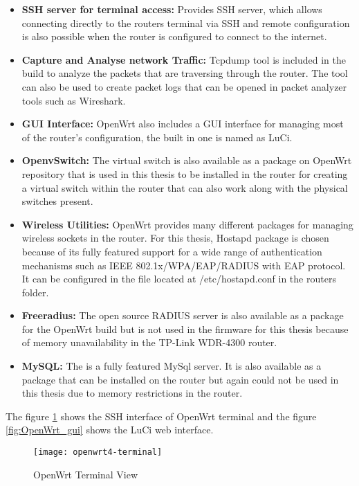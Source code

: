 \begin{itemize}
	\item \textbf{SSH server for terminal access:} Provides SSH server, which allows connecting directly to the routers terminal via SSH and remote configuration is also possible when the router is configured to connect to the internet. 
	\item \textbf{Capture and Analyse network Traffic:} Tcpdump tool is included in the build to analyze the packets that are traversing through the router. The tool can also be used to create packet logs that can be opened in packet analyzer tools such as Wireshark.
	\item \textbf{GUI Interface:} OpenWrt also includes a GUI interface for managing most of the router's configuration, the built in one is named as LuCi.
	\item \textbf{OpenvSwitch:} The virtual switch is also available as a package on OpenWrt repository that is used in this thesis to be installed in the router for creating a virtual switch within the router that can also work along with the physical switches present.
	\item \textbf{Wireless Utilities:} OpenWrt provides many different packages for managing wireless sockets in the router. For this thesis, Hostapd package is chosen because of its fully featured support for a wide range of authentication mechanisms such as IEEE 802.1x/WPA/EAP/RADIUS with EAP protocol. It can be configured in the file located at /etc/hostapd.conf in the routers folder.
	\item \textbf{Freeradius:} The open source RADIUS server is also available as a package for the OpenWrt build but is not used in the firmware for this thesis because of memory unavailability in the TP-Link WDR-4300 router.
	\item \textbf{MySQL:} The is a fully featured MySql server. It is also available as a package that can be installed on the router but again could not be used in this thesis due to memory restrictions in the router.
	
\end{itemize}
The figure \ref{fig:OpenWrt_terminal} shows the SSH interface of OpenWrt terminal and the figure \ref{fig:OpenWrt_gui} shows the LuCi web interface.
\begin{figure}
	\centering
	\texttt{[image: openwrt4-terminal]}
	\caption{OpenWrt Terminal View \cite{openwrt_terminal_img}} \label{fig:OpenWrt_terminal}
	\vspace{-10pt}
\end{figure}

